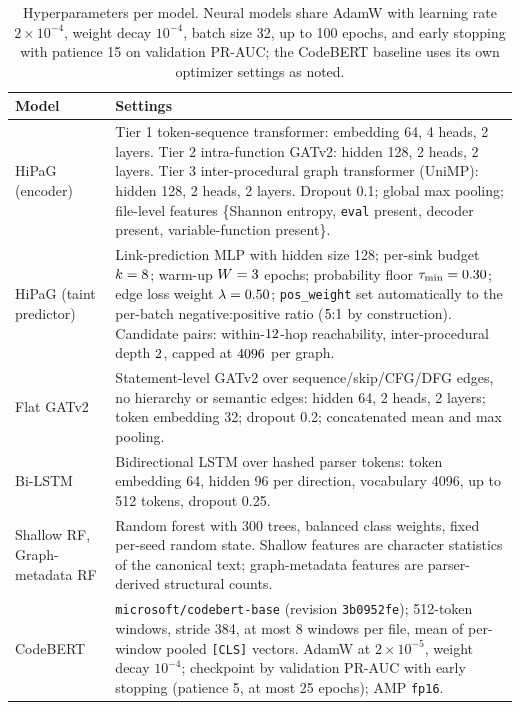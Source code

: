 \documentclass[pdflatex,sn-mathphys-num]{sn-jnl}
\begin{document}
\begin{appendices}
\begin{table}[ht]
\centering
\footnotesize
\caption{Hyperparameters per model. Neural models share AdamW with learning
rate $2\times10^{-4}$, weight decay $10^{-4}$, batch size 32, up to 100 epochs,
and early stopping with patience 15 on validation PR-AUC; the CodeBERT baseline
uses its own optimizer settings as noted.}
\label{tab:hparams}
\begin{tabular}{@{}p{}p{}@{}}
\toprule
Model & Settings \\
\midrule
HiPaG (encoder) &
Tier 1 token-sequence transformer: embedding 64, 4 heads, 2 layers. Tier 2
intra-function GATv2: hidden 128, 2 heads, 2 layers. Tier 3 inter-procedural
graph transformer (UniMP): hidden 128, 2 heads, 2 layers. Dropout 0.1; global
max pooling; file-level features \{Shannon entropy, \texttt{eval} present,
decoder present, variable-function present\}. \\
\addlinespace
HiPaG (taint predictor) &
Link-prediction MLP with hidden size 128; per-sink budget $k=8$; warm-up
$W=3$ epochs; probability floor $\tau_{\min}=0.30$; edge loss
weight $\lambda=0.50$; \texttt{pos\_weight} set automatically to the
per-batch negative:positive ratio ($5{:}1$ by construction). Candidate
pairs: within-$12$-hop reachability, inter-procedural depth
$2$, capped at $4096$ per graph. \\
\addlinespace
Flat GATv2 &
Statement-level GATv2 over sequence/skip/CFG/DFG edges, no hierarchy or
semantic edges: hidden 64, 2 heads, 2 layers; token embedding 32; dropout 0.2;
concatenated mean and max pooling. \\
\addlinespace
Bi-LSTM &
Bidirectional LSTM over hashed parser tokens: token embedding 64, hidden 96 per
direction, vocabulary 4096, up to 512 tokens, dropout 0.25. \\
\addlinespace
Shallow RF, Graph-metadata RF &
Random forest with 300 trees, balanced class weights, fixed per-seed random
state. Shallow features are character statistics of the canonical text;
graph-metadata features are parser-derived structural counts. \\
\addlinespace
CodeBERT &
\texttt{microsoft/codebert-base} (revision \texttt{3b0952fe}); 512-token
windows, stride 384, at most 8 windows per file, mean of per-window pooled
\texttt{[CLS]} vectors. AdamW at $2\times10^{-5}$, weight decay $10^{-4}$;
checkpoint by validation PR-AUC with early stopping (patience 5, at most 25
epochs); AMP \texttt{fp16}. \\
\bottomrule
\end{tabular}
\end{table}

\end{appendices}
\end{document}
